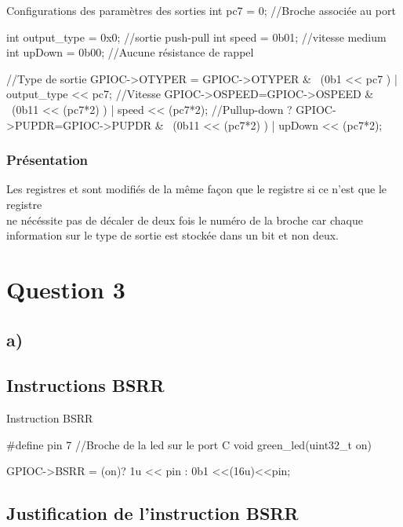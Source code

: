   \begin{Cpp}{Configurations des paramètres des sorties}
  int pc7 = 0;   //Broche associée au port
  
  int output_type = 0x0;   //sortie push-pull
  int speed = 0b01;        //vitesse medium
  int upDown = 0b00;       //Aucune résistance de rappel

  //Type de sortie
  GPIOC->OTYPER = GPIOC->OTYPER & ~(0b1 << pc7 ) | output_type << pc7; 
  //Vitesse
  GPIOC->OSPEED=GPIOC->OSPEED & ~(0b11 << (pc7*2) ) | speed << (pc7*2);
  //Pullup-down ?
  GPIOC->PUPDR=GPIOC->PUPDR & ~(0b11 << (pc7*2) ) | upDown << (pc7*2);

\end{Cpp}

\subsubsection{Présentation}

Les registres  et  sont modifiés de la même façon que le registre   si ce n'est que le registre \\
 ne nécéssite pas de décaler de deux fois le numéro de la broche car chaque information sur le type de sortie est stockée dans un bit et non deux.


\section{Question 3}

\subsection{a)}

\subsection{Instructions BSRR}

\begin{Cpp}{Instruction BSRR}
  
  #define pin 7 //Broche de la led sur le port C
  void green_led(uint32_t on) {

    GPIOC->BSRR = (on)?  1u << pin  :  0b1 <<(16u)<<pin;
    
  }
  

\end{Cpp}

\subsection{Justification de l'instruction BSRR}

